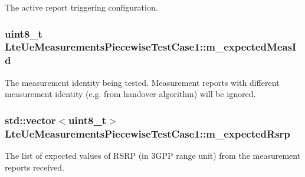 The active report triggering configuration. 

\subsubsection[{\texorpdfstring{m\+\_\+expected\+Meas\+Id}{m_expectedMeasId}}]{\setlength{\rightskip}{0pt plus 5cm}uint8\+\_\+t Lte\+Ue\+Measurements\+Piecewise\+Test\+Case1\+::m\+\_\+expected\+Meas\+Id\hspace{0.3cm}{\ttfamily [private]}}\hypertarget{classLteUeMeasurementsPiecewiseTestCase1_a39095f59bf1a01ce9b08d52ee7b89340}{}\label{classLteUeMeasurementsPiecewiseTestCase1_a39095f59bf1a01ce9b08d52ee7b89340}


The measurement identity being tested. Measurement reports with different measurement identity (e.\+g. from handover algorithm) will be ignored. 

\subsubsection[{\texorpdfstring{m\+\_\+expected\+Rsrp}{m_expectedRsrp}}]{\setlength{\rightskip}{0pt plus 5cm}std\+::vector$<$uint8\+\_\+t$>$ Lte\+Ue\+Measurements\+Piecewise\+Test\+Case1\+::m\+\_\+expected\+Rsrp\hspace{0.3cm}{\ttfamily [private]}}\hypertarget{classLteUeMeasurementsPiecewiseTestCase1_abac81553dc6e6c5f9a0721a609647753}{}\label{classLteUeMeasurementsPiecewiseTestCase1_abac81553dc6e6c5f9a0721a609647753}


The list of expected values of R\+S\+RP (in 3\+G\+PP range unit) from the measurement reports received. 

